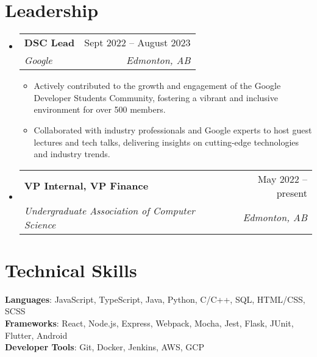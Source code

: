 \documentclass[letterpaper,11pt]{article}
\makeatletter
\newcommand{\resumeItem}[1]{
  \item\small{
    {#1 \vspace{-2pt}}
  }
}
\newcommand{\resumeSubheading}[4]{
  \vspace{-2pt}\item
    \begin{tabular*}{0.97\textwidth}[t]{l@{\extracolsep{\fill}}r}
      \textbf{#1} & #2 \\
      \textit{\small#3} & \textit{\small #4} \\
    \end{tabular*}\vspace{-7pt}
}
\newcommand{\resumeSubHeadingListStart}{\begin{itemize}[leftmargin=0.15in, label={}]}
\newcommand{\resumeSubHeadingListEnd}{\end{itemize}}
\newcommand{\resumeItemListStart}{\begin{itemize}}
\newcommand{\resumeItemListEnd}{\end{itemize}\vspace{-5pt}}
\makeatother
\begin{document}
\section{Leadership}
    \resumeSubHeadingListStart
      \resumeSubheading
        {DSC Lead}{Sept 2022 -- August 2023}
        {Google}{Edmonton, AB}
        \resumeItemListStart
          \resumeItem{Actively contributed to the growth and engagement of the Google Developer Students Community, fostering a vibrant and inclusive environment for over 500 members.}
          \resumeItem{Collaborated with industry professionals and Google experts to host guest lectures and tech talks, delivering insights on cutting-edge technologies and industry trends.}
        \resumeItemListEnd
      \resumeSubheading
        {VP Internal, VP Finance}{May 2022 -- present}
        {Undergraduate Association of Computer Science}{Edmonton, AB}
    \resumeSubHeadingListEnd
%
\section{Technical Skills}
 \begin{itemize}[leftmargin=0.15in, label={}]
    \small{\item{
     \textbf{Languages}{: JavaScript, TypeScript, Java, Python, C/C++, SQL, HTML/CSS, SCSS} \\
     \textbf{Frameworks}{: React, Node.js, Express, Webpack, Mocha, Jest, Flask, JUnit, Flutter, Android} \\
     \textbf{Developer Tools}{: Git, Docker, Jenkins, AWS, GCP} \\
    }}
 \end{itemize}

\end{document}
